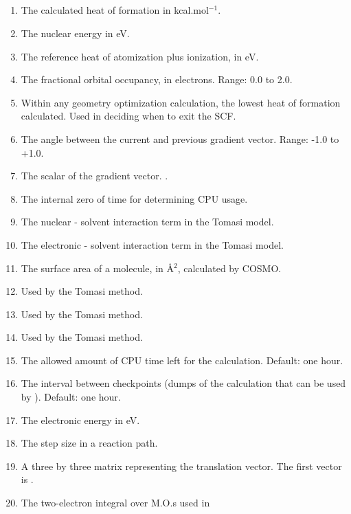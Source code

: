 \subsection*{}
\begin{enumerate}
\item {} The calculated heat of formation in kcal.mol$^{-1}$.
\item {} The nuclear energy in eV.
\addtocounter{enumi}{1}
\item {} The reference heat of atomization plus ionization, in eV.
\item {} The fractional orbital occupancy, in electrons.  Range:
0.0 to 2.0.
\item {} Within any geometry optimization calculation, the lowest
heat of formation calculated.  Used in deciding when to exit the SCF.
\item {} The angle between the current and previous gradient
vector.  Range: -1.0 to +1.0.
\item {} The scalar of the gradient vector. .
\item {} The internal zero of time for determining CPU usage.
\item {} The nuclear - solvent interaction term in the Tomasi model.
\item {} The electronic - solvent interaction term in the Tomasi model.
\item {} The surface area of a molecule, in \AA $^2$, calculated by COSMO.
\addtocounter{enumi}{1}
\item {} Used by the Tomasi method.
\item {} Used by the Tomasi method.
\item {} Used by the Tomasi method.
\item {} The allowed amount of CPU time left for the calculation.
Default: one hour.
\item {} The interval between checkpoints (dumps of the calculation
that can be used by ).  Default: one hour.
\item {} The electronic energy in eV.
\item {} The step size in a reaction path.
\item {} A three by three matrix representing the translation vector.
The first vector is .
\addtocounter{enumi}{8}
\item {} The two-electron integral over M.O.s used in

\end{enumerate}
